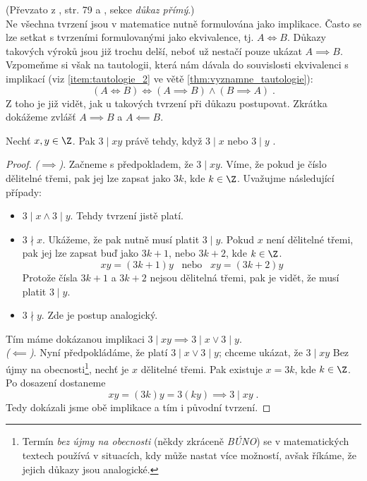 (Převzato z \cite{ChartrandPolimeniZhang2014}, str. 79 a \cite{MatematickaLogikaUK2010}, sekce \emph{důkaz přímý}.)\\
Ne všechna tvrzení jsou v matematice nutně formulována jako implikace. Často se lze setkat s tvrzeními formulovanými jako ekvivalence, tj. $A \iff B$. Důkazy takových výroků jsou již trochu delší, neboť už nestačí pouze ukázat $A \implies B$. Vzpomeňme si však na tautologii, která nám dávala do souvislosti ekvivalenci s implikací (viz \ref{item:tautologie_2} ve větě \ref{thm:vyznamne_tautologie}):
\begin{equation*}
    (A \iff B) \iff (A \implies B) \land (B \implies A)\; .
\end{equation*}
Z toho je již vidět, jak u takových tvrzení při důkazu postupovat. Zkrátka dokážeme zvlášť $A \implies B$ a $A \impliedby B$.
\begin{assertion}
    Nechť $x,y\in\Z$. Pak $3 \mid xy$ právě tehdy, když $3 \mid x$ nebo $3 \mid y$\; .
\end{assertion}
\begin{proof}
    \textit{($\implies$)}. Začneme s předpokladem, že $3 \mid xy$. Víme, že pokud je číslo dělitelné třemi, pak jej lze zapsat jako $3k$, kde $k\in\Z$. Uvažujme následující případy:
    \begin{itemize}
        \item $3 \mid x \land 3 \mid y$. Tehdy tvrzení jistě platí.
        \item $3 \nmid x$. Ukážeme, že pak nutně musí platit $3 \mid y$. Pokud $x$ není dělitelné třemi, pak jej lze zapsat buď jako $3k+1$, nebo $3k+2$, kde $k\in\Z$. 
        \begin{equation*}
            xy=(3k+1)y\;\;\;\text{nebo}\;\;\;xy=(3k+2)y
        \end{equation*}
        Protože čísla $3k+1$ a $3k+2$ nejsou dělitelná třemi, pak je vidět, že musí platit $3 \mid y$.
        \item $3 \nmid y$. Zde je postup analogický. 
    \end{itemize}
    Tím máme dokázanou implikaci $3 \mid xy \implies 3 \mid x \lor 3 \mid y$.\\
    \textit{($\impliedby$)}. Nyní předpokládáme, že platí $3 \mid x \lor 3 \mid y$; chceme ukázat, že $3 \mid xy$ Bez újmy na obecnosti\footnote{Termín \emph{bez újmy na obecnosti} (někdy zkráceně \emph{BÚNO}) se v matematických textech používá v situacích, kdy může nastat více možností, avšak říkáme, že jejich důkazy jsou analogické.}, nechť je $x$ dělitelné třemi. Pak existuje $x=3k$, kde $k\in\Z$. Po dosazení dostaneme
    \begin{equation*}
        xy=(3k)y=3(ky) \implies 3 \mid xy\; .
    \end{equation*}
    Tedy dokázali jsme obě implikace a tím i původní tvrzení.
\end{proof}
